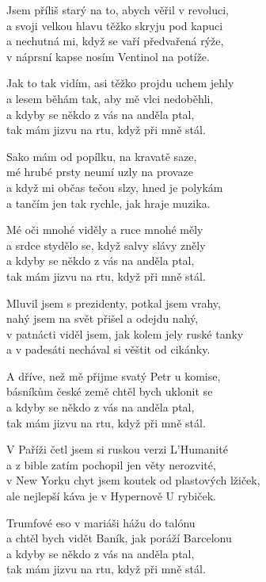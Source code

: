 
\ve{}
Jsem příliš starý na to, abych věřil v revoluci,\\
a svoji velkou hlavu těžko skryju pod kapuci\\
a nechutná mi, když se vaří předvařená rýže,\\
v náprsní kapse nosím Ventinol na potíže.

Jak to tak vidím, asi těžko projdu uchem jehly\\
a lesem běhám tak, aby mě vlci nedoběhli,\\
a kdyby se někdo z vás na anděla ptal,\\
tak mám jizvu na rtu, když při mně stál.

\ve{}
Sako mám od popílku, na kravatě saze,\\
mé hrubé prsty neumí uzly na provaze\\
a když mi občas tečou slzy, hned je polykám\\
a tančím jen tak rychle, jak hraje muzika.

Mé oči mnohé viděly a ruce mnohé měly\\
a srdce stydělo se, když salvy slávy zněly\\
a kdyby se někdo z vás na anděla ptal,\\
tak mám jizvu na rtu, když při mně stál.

\ve{}
Mluvil jsem s prezidenty, potkal jsem vrahy,\\
nahý jsem na svět přišel a odejdu nahý,\\
v patnácti viděl jsem, jak kolem jely ruské tanky\\
a v padesáti nechával si věštit od cikánky.

A dříve, než mě přijme svatý Petr u komise,\\
básníkům české země chtěl bych uklonit se\\
a kdyby se někdo z vás na anděla ptal,\\
tak mám jizvu na rtu, když při mně stál.

\ve{}
V Paříži četl jsem si ruskou verzi L'Humanité\\
a z bible zatím pochopil jen věty nerozvité,\\
v New Yorku chyt jsem koutek od plastových lžiček,\\
ale nejlepší káva je v Hypernově U rybiček.

Trumfové eso v mariáši hážu do talónu\\
a chtěl bych vidět Baník, jak poráží Barcelonu\\
a kdyby se někdo z vás na anděla ptal,\\
tak mám jizvu na rtu, když při mně stál.

